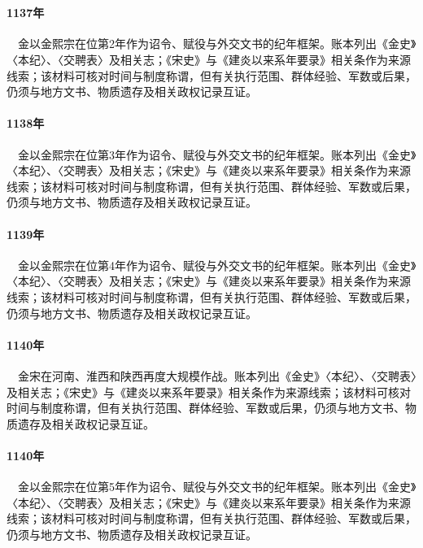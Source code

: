 \section{}

\paragraph{1137年}　金以金熙宗在位第2年作为诏令、赋役与外交文书的纪年框架。账本列出《金史》〈本纪〉、〈交聘表〉及相关志；《宋史》与《建炎以来系年要录》相关条作为来源线索；该材料可核对时间与制度称谓，但有关执行范围、群体经验、军数或后果，仍须与地方文书、物质遗存及相关政权记录互证。

\paragraph{1138年}　金以金熙宗在位第3年作为诏令、赋役与外交文书的纪年框架。账本列出《金史》〈本纪〉、〈交聘表〉及相关志；《宋史》与《建炎以来系年要录》相关条作为来源线索；该材料可核对时间与制度称谓，但有关执行范围、群体经验、军数或后果，仍须与地方文书、物质遗存及相关政权记录互证。

\paragraph{1139年}　金以金熙宗在位第4年作为诏令、赋役与外交文书的纪年框架。账本列出《金史》〈本纪〉、〈交聘表〉及相关志；《宋史》与《建炎以来系年要录》相关条作为来源线索；该材料可核对时间与制度称谓，但有关执行范围、群体经验、军数或后果，仍须与地方文书、物质遗存及相关政权记录互证。

\paragraph{1140年}　金宋在河南、淮西和陕西再度大规模作战。账本列出《金史》〈本纪〉、〈交聘表〉及相关志；《宋史》与《建炎以来系年要录》相关条作为来源线索；该材料可核对时间与制度称谓，但有关执行范围、群体经验、军数或后果，仍须与地方文书、物质遗存及相关政权记录互证。

\paragraph{1140年}　金以金熙宗在位第5年作为诏令、赋役与外交文书的纪年框架。账本列出《金史》〈本纪〉、〈交聘表〉及相关志；《宋史》与《建炎以来系年要录》相关条作为来源线索；该材料可核对时间与制度称谓，但有关执行范围、群体经验、军数或后果，仍须与地方文书、物质遗存及相关政权记录互证。

